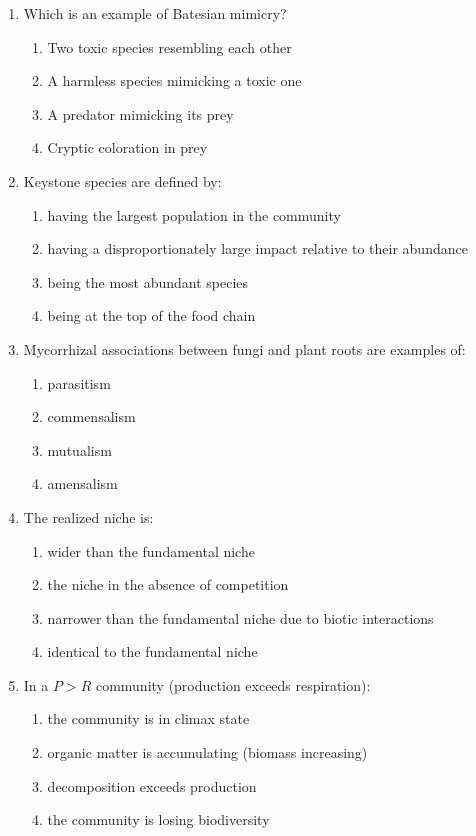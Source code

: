 \documentclass[11pt]{article}
\begin{document}
\begin{enumerate}[label=\textbf{\arabic*.}]
\item Which is an example of Batesian mimicry?
\begin{enumerate}[label=\Alph*.]
  \item Two toxic species resembling each other
  \item A harmless species mimicking a toxic one
  \item A predator mimicking its prey
  \item Cryptic coloration in prey
\end{enumerate}

\item Keystone species are defined by:
\begin{enumerate}[label=\Alph*.]
  \item having the largest population in the community
  \item having a disproportionately large impact relative to their abundance
  \item being the most abundant species
  \item being at the top of the food chain
\end{enumerate}

\item Mycorrhizal associations between fungi and plant roots are examples of:
\begin{enumerate}[label=\Alph*.]
  \item parasitism
  \item commensalism
  \item mutualism
  \item amensalism
\end{enumerate}

\item The realized niche is:
\begin{enumerate}[label=\Alph*.]
  \item wider than the fundamental niche
  \item the niche in the absence of competition
  \item narrower than the fundamental niche due to biotic interactions
  \item identical to the fundamental niche
\end{enumerate}

\item In a $P > R$ community (production exceeds respiration):
\begin{enumerate}[label=\Alph*.]
  \item the community is in climax state
  \item organic matter is accumulating (biomass increasing)
  \item decomposition exceeds production
  \item the community is losing biodiversity
\end{enumerate}


\end{enumerate}
\end{document}
